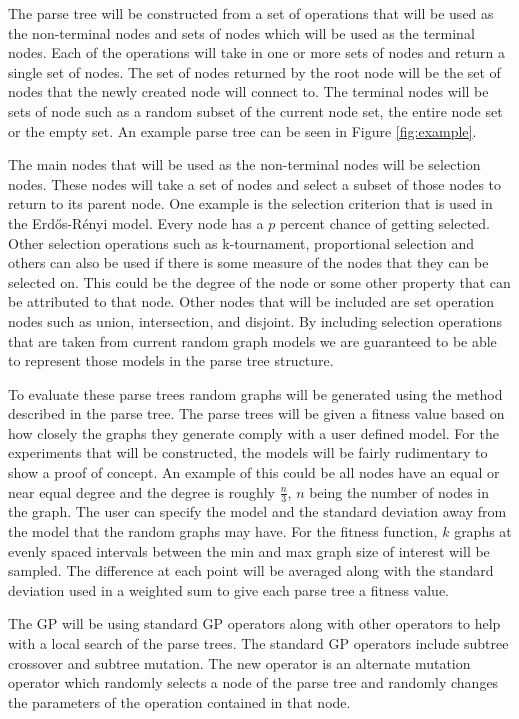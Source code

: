 \documentclass{article}
\begin{document}
The parse tree will be constructed from a set of operations that will be used as the non-terminal nodes and sets of nodes which will be used as the terminal nodes.  Each of the operations will take in one or more sets of nodes and return a single set of nodes. The set of nodes returned by the root node will be the set of nodes that the newly created node will connect to. The terminal nodes will be sets of node such as a random subset of the current node set, the entire node set or the empty set. An example parse tree can be seen in Figure \ref{fig:example}.

The main nodes that will be used as the non-terminal nodes will be selection nodes. These nodes will take a set of nodes and select a subset of those nodes to return to its parent node. One example is the selection criterion that is used in the Erd\H{o}s-R\'{e}nyi model. Every node has a $p$ percent chance of getting selected.  Other selection operations such as k-tournament, proportional selection and others can also be used if there is some measure of the nodes that they can be selected on. This could be the degree of the node or some other property that can be attributed to that node.  Other nodes that will be included are set operation nodes such as union, intersection, and disjoint.  By including selection operations that are taken from current random graph models we are guaranteed to be able to represent those models in the parse tree structure.

To evaluate these parse trees random graphs will be generated using the method described in the parse tree. The parse trees will be given a fitness value based on how closely the graphs they generate comply with a user defined model. For the experiments that will be constructed, the models will be fairly rudimentary to show a proof of concept. An example of this could be all nodes have an equal or near equal degree and the degree is roughly $\frac{n}{3}$, $n$ being the number of nodes in the graph.  The user can specify the model and the standard deviation away from the model that the random graphs may have. For the fitness function, $k$ graphs at evenly spaced intervals between the min and max graph size of interest will be sampled. The difference at each point will be averaged along with the standard deviation used in a weighted sum to give each parse tree a fitness value.

The GP will be using standard GP operators along with other operators to help with a local search of the parse trees. The standard GP operators include subtree crossover and subtree mutation. The new operator is an alternate mutation operator which randomly selects a node of the parse tree and randomly changes the parameters of the operation contained in that node.




 
\end{document}

